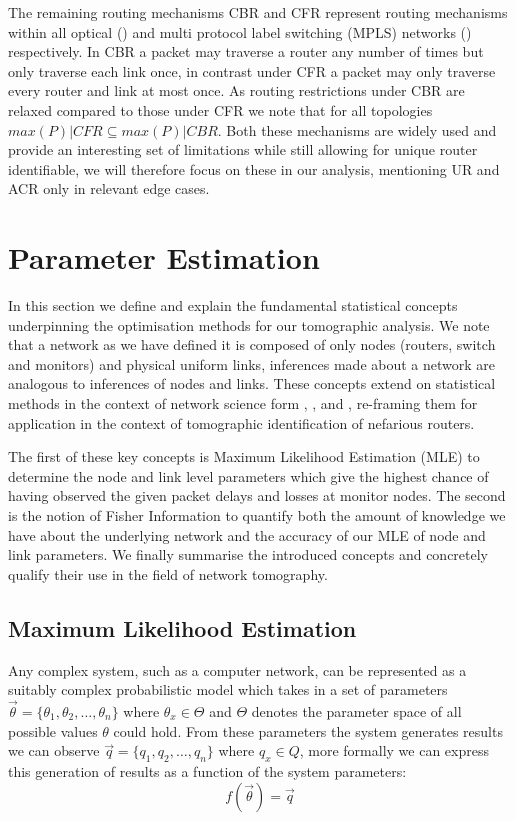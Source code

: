     The remaining routing mechanisms CBR and CFR represent routing mechanisms within all optical (\cite{ahuja_srlg_2011}) and multi protocol label switching (MPLS) networks (\cite{rosen_multiprotocol_2001}) respectively. In CBR a packet may traverse a router any number of times but only traverse each link once, in contrast under CFR a packet may only traverse every router and link at most once. As routing restrictions under CBR are relaxed compared to those under CFR we note that for all topologies $max(P)|CFR \subseteq max(P)|CBR$. Both these mechanisms are widely used and provide an interesting set of limitations while still allowing for unique router identifiable, we will therefore focus on these in our analysis, mentioning UR and ACR only in relevant edge cases.

\section{Parameter Estimation}
\label{sec:Bparameterestimation}

In this section we define and explain the fundamental statistical concepts underpinning the optimisation methods for our tomographic analysis. We note that a network as we have defined it is composed of only nodes (routers, switch and monitors) and physical uniform links, inferences made about a network are analogous to inferences of nodes and links. These concepts extend on statistical methods in the context of network science form \cite{meng_method_2016}, \cite{he_fisher_2015}, and \cite{he_network_2021}, re-framing them for application in the context of tomographic identification of nefarious routers.\par
The first of these key concepts is Maximum Likelihood Estimation (MLE) to determine the node and link level parameters which give the highest chance of having observed the given packet delays and losses at monitor nodes. The second is the notion of Fisher Information to quantify both the amount of knowledge we have about the underlying network and the accuracy of our MLE of node and link parameters. We finally summarise the introduced concepts and concretely qualify their use in the field of network tomography.

\subsection{Maximum Likelihood Estimation}
\label{ssec:Bmle}

Any complex system, such as a computer network, can be represented as a suitably complex probabilistic model which takes in a set of parameters $\vec{\theta} = \{\theta_1, \theta_2,\ldots,\theta_n\}$ where $\theta_x \in \Theta$ and $\Theta$ denotes the parameter space of all possible values $\theta$ could hold. From these parameters the system generates results we can observe $\vec{q} = \{q_1,q_2,\ldots,q_n\}$ where $q_x \in Q$, more formally we can express this generation of results as a function of the system parameters: \[f(\vec{\theta}) = \vec{q}\]

